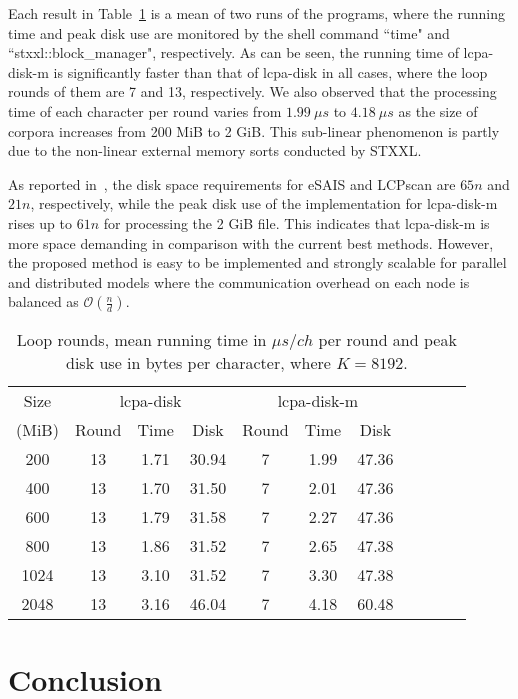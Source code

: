 \documentclass{llncs}
\begin{document}
Each result in Table~\ref{tbl:exp:result} is a mean of two runs of the programs, where the running time and peak disk use are monitored by the shell command ``time" and ``stxxl::block\_manager", respectively. As can be seen, the running time of lcpa-disk-m is significantly faster than that of lcpa-disk in all cases, where the loop rounds of them are 7 and 13, respectively. We also observed that the processing time of each character per round varies from $1.99\ \mu s$ to $4.18\ \mu s$ as the size of corpora increases from 200 MiB to 2 GiB. This sub-linear phenomenon is partly due to the non-linear external memory sorts conducted by STXXL.

As reported in~\cite{Juha2014}, the disk space requirements for eSAIS and LCPscan are $65n$ and $21n$, respectively, while the peak disk use of the implementation for lcpa-disk-m rises up to $61n$ for processing the 2 GiB file. This indicates that {lcpa-disk-m} is more space demanding in comparison with the current best methods. However, the proposed method is easy to be implemented and strongly scalable for parallel and distributed models where the communication overhead on each node is balanced as $\mathcal{O}(\frac{n}{d})$.


\begin{table}
\centering
\label{tbl:exp:result}
\caption{\label{tbl:exp:result} Loop rounds, mean running time in $\mu s/ch$ per round and peak disk use in bytes per character, where $K=8192$.}
\begin{tabular}{|c|c|c|c|c|c|c|c|c|c|c|}
\hline
Size &
\multicolumn{3}{c|}{lcpa-disk} &
\multicolumn{3}{c|}{lcpa-disk-m} \\
\cline{2-7}
 (MiB) & Round &  Time &  Disk & Round & Time &  Disk \\
\hline
200 & 13 & 1.71 & 30.94 & 7 & 1.99 & 47.36\\
\hline
400 & 13 & 1.70 & 31.50  & 7 & 2.01 & 47.36\\
\hline
600 & 13 & 1.79 & 31.58 & 7 & 2.27 & 47.36\\
\hline
800 & 13 & 1.86 & 31.52 & 7 & 2.65 & 47.38\\
\hline
1024 & 13 & 3.10 & 31.52 & 7 & 3.30 & 47.38\\
\hline
2048 & 13 & 3.16 & 46.04 & 7 & 4.18 & 60.48\\
\hline
\end{tabular}
\end{table}

\section{Conclusion}\label{sec:conclusion}
\end{document}
